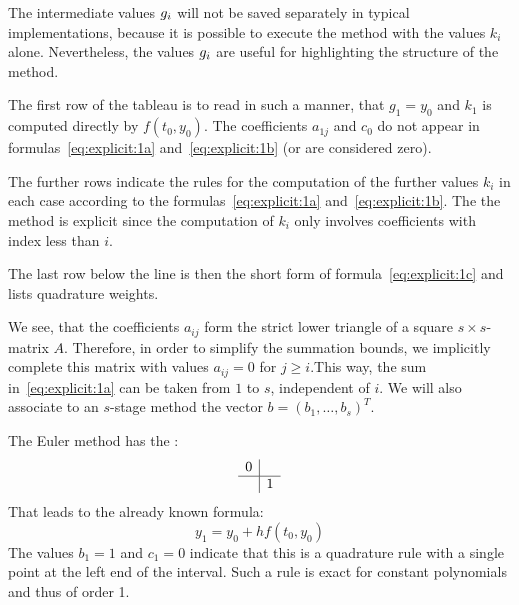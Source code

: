 \begin{remark}
  The intermediate values $g_i$ will not be saved separately in
  typical implementations, because it is possible to execute the
  method with the values $k_i$ alone. Nevertheless, the values
  $g_i$ are useful for highlighting the structure of the method.
\end{remark}



\begin{remark}
  The first row of the tableau is to read in such a manner, that
  $g_1 = y_0$ and $k_1$ is computed directly by $f(t_0, y_0)$. The
  coefficients $a_{1j}$ and $c_0$ do not appear in formulas~\eqref{eq:explicit:1a}
  and~\eqref{eq:explicit:1b} (or are considered zero).
  
  The further rows indicate the rules for the computation of the
  further values $k_i$ in each case according to the
  formulas~\eqref{eq:explicit:1a} and~\eqref{eq:explicit:1b}. The
  the method is explicit since the computation of $k_i$ only involves
  coefficients with index less than $i$.
  
  The last row below the line is then the short form of
  formula~\eqref{eq:explicit:1c} and lists quadrature weights.

  We see, that the coefficients $a_{ij}$ form the strict lower
  triangle of a square $s\times s$-matrix $A$. Therefore, in order to
  simplify the summation bounds, we implicitly complete this matrix
  with values $a_{ij} = 0$ for $j\ge i$.This way, the sum
  in~\eqref{eq:explicit:1a} can be taken from $1$ to $s$, independent
  of $i$. We will also associate to an $s$-stage method the vector $b
  = (b_1,\dots,b_s)^T$.
\end{remark}

\begin{example}
  The Euler method  has the :
  \begin{gather*}
    \begin{array}{c|c}
      0 & \\
      \hline
        & 1 \\
    \end{array}
  \end{gather*}
  That leads to the already known formula:
  \begin{equation*}
    y_1 = y_0 + h f(t_0, y_0)
  \end{equation*}
  The values $b_1=1$ and $c_1=0$ indicate that this is a quadrature
  rule with a single point at the left end of the interval. Such a
  rule is exact for constant polynomials and thus of order 1.
\end{example}

